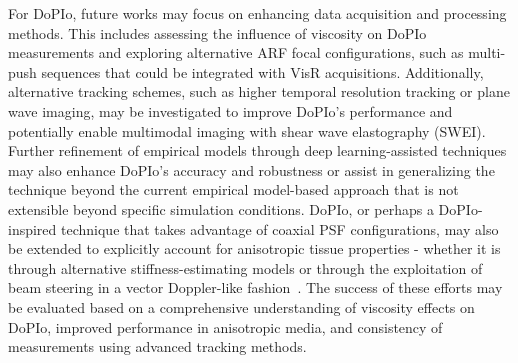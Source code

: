 %
%

For DoPIo, future works may focus on enhancing data acquisition and processing methods. This includes assessing the influence of viscosity on DoPIo measurements and exploring alternative ARF focal configurations, such as multi-push sequences that could be integrated with VisR acquisitions. Additionally, alternative tracking schemes, such as higher temporal resolution tracking or plane wave imaging, may be investigated to improve DoPIo's performance and potentially enable multimodal imaging with shear wave elastography (SWEI). Further refinement of empirical models through deep learning-assisted techniques may also enhance DoPIo's accuracy and robustness or assist in generalizing the technique beyond the current empirical model-based approach that is not extensible beyond specific simulation conditions. DoPIo, or perhaps a DoPIo-inspired technique that takes advantage of coaxial PSF configurations, may also be extended to explicitly account for anisotropic tissue properties - whether it is through alternative stiffness-estimating models or through the exploitation of beam steering in a vector Doppler-like fashion~\cite{andrade_Simultaneous_2025}. The success of these efforts may be evaluated based on a comprehensive understanding of viscosity effects on DoPIo, improved performance in anisotropic media, and consistency of measurements using advanced tracking methods.

